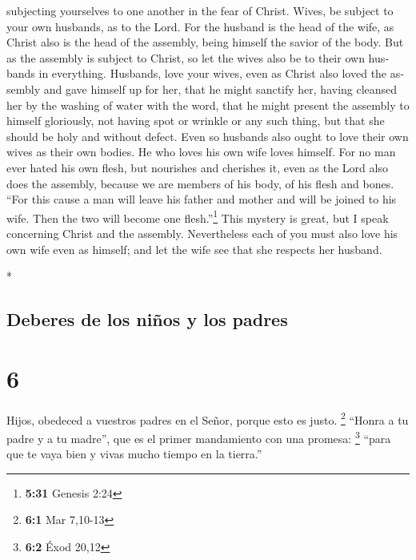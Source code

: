 \begin{paracol}{2}
\begin{otherlanguage}{english}
 subjecting yourselves to one another in the fear of
Christ.  Wives, be subject to your own husbands, as to
the Lord.  For the husband is the head of the wife, as
Christ also is the head of the assembly, being himself the savior of the
body.  But as the assembly is subject to Christ, so let
the wives also be to their own husbands in everything. 
Husbands, love your wives, even as Christ also loved the assembly and
gave himself up for her,  that he might sanctify her,
having cleansed her by the washing of water with the word,
 that he might present the assembly to himself
gloriously, not having spot or wrinkle or any such thing, but that she
should be holy and without defect.  Even so husbands also
ought to love their own wives as their own bodies. He who loves his own
wife loves himself.  For no man ever hated his own flesh,
but nourishes and cherishes it, even as the Lord also does the assembly,
 because we are members of his body, of his flesh and
bones.  ``For this cause a man will leave his father and
mother and will be joined to his wife. Then the two will become one
flesh.''\footnote{\textbf{5:31} Genesis 2:24}  This
mystery is great, but I speak concerning Christ and the assembly.
 Nevertheless each of you must also love his own wife
even as himself; and let the wife see that she respects her husband.

\end{otherlanguage}

\switchcolumn[0]*

\hypertarget{deberes-de-los-niuxf1os-y-los-padres}{%
\subsection{Deberes de los niños y los
padres}\label{deberes-de-los-niuxf1os-y-los-padres}}

\hypertarget{section-10}{%
\section{6}\label{section-10}}

 Hijos, obedeced a vuestros padres en el Señor, porque
esto es justo. \footnote{\textbf{6:1} Mar 7,10-13} 
``Honra a tu padre y a tu madre'', que es el primer mandamiento con una
promesa: \footnote{\textbf{6:2} Éxod 20,12}  ``para que te
vaya bien y vivas mucho tiempo en la tierra.''


\end{paracol}
